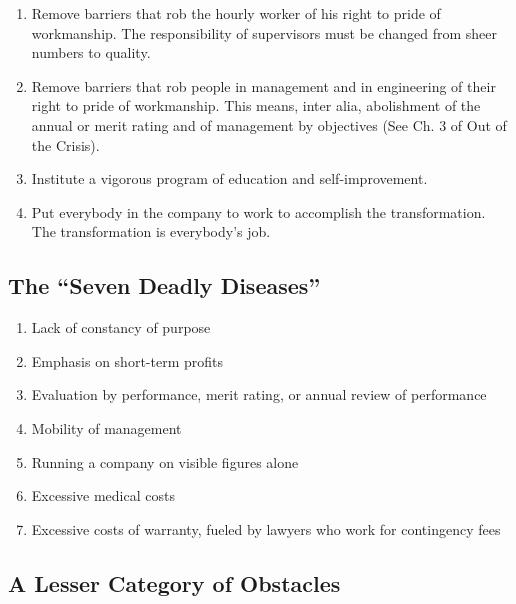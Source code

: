 \documentclass[
]{book}
\begin{document}
\begin{enumerate}
\item
  Remove barriers that rob the hourly worker of his right to pride of workmanship. The responsibility of supervisors must be changed from sheer numbers to quality.
\item
  Remove barriers that rob people in management and in engineering of their right to pride of workmanship. This means, inter alia, abolishment of the annual or merit rating and of management by objectives (See Ch. 3 of Out of the Crisis).
\item
  Institute a vigorous program of education and self-improvement.
\item
  Put everybody in the company to work to accomplish the transformation. The transformation is everybody's job.
\end{enumerate}

\hypertarget{the-seven-deadly-diseases}{%
\subsection{The ``Seven Deadly Diseases''}\label{the-seven-deadly-diseases}}

\begin{enumerate}
\def\labelenumi{\arabic{enumi}.}
\item
  Lack of constancy of purpose
\item
  Emphasis on short-term profits
\item
  Evaluation by performance, merit rating, or annual review of performance
\item
  Mobility of management
\item
  Running a company on visible figures alone
\item
  Excessive medical costs
\item
  Excessive costs of warranty, fueled by lawyers who work for contingency fees
\end{enumerate}

\hypertarget{a-lesser-category-of-obstacles}{%
\subsection{A Lesser Category of Obstacles}\label{a-lesser-category-of-obstacles}}
\end{document}
